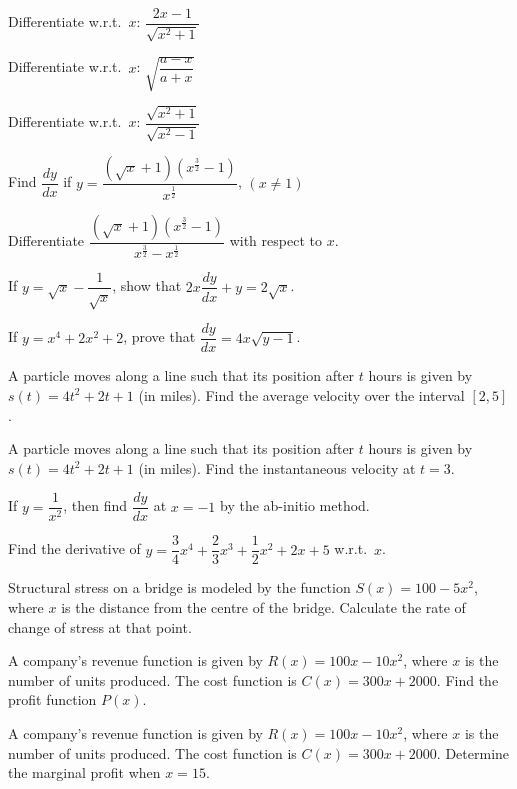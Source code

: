 \documentclass[11pt,a4paper]{article}
\begin{document}
\begin{longlist}
\item Differentiate w.r.t.\ $x$: $\dfrac{2x-1}{\sqrt{x^2+1}}$

\item Differentiate w.r.t.\ $x$: $\sqrt{\dfrac{a-x}{a+x}}$

\item Differentiate w.r.t.\ $x$: $\dfrac{\sqrt{x^2+1}}{\sqrt{x^2-1}}$

\item Find $\dfrac{dy}{dx}$ if $y = \dfrac{(\sqrt{x}+1)\left(x^{\frac{3}{2}}-1\right)}{x^{\frac{1}{2}}}$, $(x\neq 1)$

\item Differentiate $\dfrac{(\sqrt{x}+1)\left(x^{\frac{3}{2}}-1\right)}{x^{\frac{3}{2}}-x^{\frac{1}{2}}}$ with respect to $x$.

\item If $y = \sqrt{x}-\dfrac{1}{\sqrt{x}}$, show that $2x\dfrac{dy}{dx}+y = 2\sqrt{x}$.

\item If $y = x^4+2x^2+2$, prove that $\dfrac{dy}{dx}=4x\sqrt{y-1}$.

\item A particle moves along a line such that its position after $t$ hours is given by $s(t)=4t^2+2t+1$ (in miles). Find the average velocity over the interval $[2,5]$.

\item A particle moves along a line such that its position after $t$ hours is given by $s(t)=4t^2+2t+1$ (in miles). Find the instantaneous velocity at $t=3$.

\item If $y = \dfrac{1}{x^2}$, then find $\dfrac{dy}{dx}$ at $x=-1$ by the ab-initio method.

\item Find the derivative of $y = \dfrac{3}{4}x^4+\dfrac{2}{3}x^3+\dfrac{1}{2}x^2+2x+5$ w.r.t.\ $x$.

\item Structural stress on a bridge is modeled by the function $S(x)=100-5x^2$, where $x$ is the distance from the centre of the bridge. Calculate the rate of change of stress at that point.

\item A company's revenue function is given by $R(x)=100x-10x^2$, where $x$ is the number of units produced. The cost function is $C(x)=300x+2000$. Find the profit function $P(x)$.

\item A company's revenue function is given by $R(x)=100x-10x^2$, where $x$ is the number of units produced. The cost function is $C(x)=300x+2000$. Determine the marginal profit when $x=15$.


\end{longlist}
\end{document}
